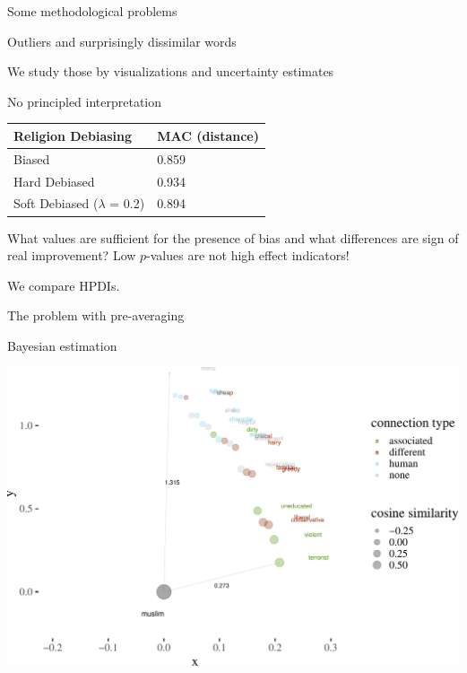 \documentclass[10pt,ignorenonframetext,x11names, dvipsnames, bibspacing,natbib]{beamer}
\begin{document}
\begin{frame}{Some methodological problems}

\begin{block}{Outliers and surprisingly dissimilar words}

We study those by visualizations and uncertainty estimates

\pause

\end{block}

\begin{block}{No principled interpretation}

\begin{longtable}[]{@{}ll@{}}
\toprule
Religion Debiasing & MAC (distance)\tabularnewline
\midrule
\endhead
Biased & 0.859\tabularnewline
Hard Debiased & 0.934\tabularnewline
Soft Debiased (\(\lambda\) = 0.2) & 0.894\tabularnewline
\bottomrule
\end{longtable}

What values are sufficient for the presence of bias and what differences
are sign of real improvement? Low \(p\)-values are not high effect
indicators!

We compare HPDIs.

\end{block}

\end{frame}

\begin{frame}{The problem with pre-averaging}

\end{frame}

\begin{frame}{Bayesian estimation}

\begin{center}\includegraphics[width=1.05\linewidth]{presentationESSLLI_files/figure-beamer/unnamed-chunk-2-1} \end{center}

\end{frame}
\end{document}
